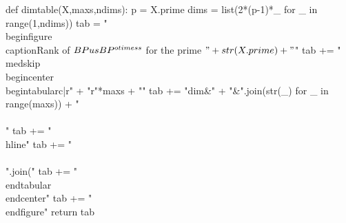 \documentclass[a4paper]{paper}
\newcommand{\BP}{BP}
\newcommand{\us}{_\ast}
\begin{document}




\begin{sagesilent}
def dimtable(X,maxs,ndims):
    p = X.prime
    dims = list(2*(p-1)*_ for _ in range(1,ndims))
    tab = "\\begin{figure}\\caption{Rank of $\\BP\\us\\BP^{\\otimes s}$ for the prime $"+str(X.prime)+"$}\n"
    tab += "\\medskip\\begin{center}\\begin{tabular}{c|r" + "r"*maxs + "}\n"
    tab += "dim&" + "&".join(str(_) for _ in range(maxs)) + "\\\\\n"
    tab += "\\hline\n"
    tab += "\\\\\n".join("%
    tab += "\n\\end{tabular}\\end{center}"
    tab += "\n\\end{figure}"
    return tab
\end{sagesilent}

\end{document}
